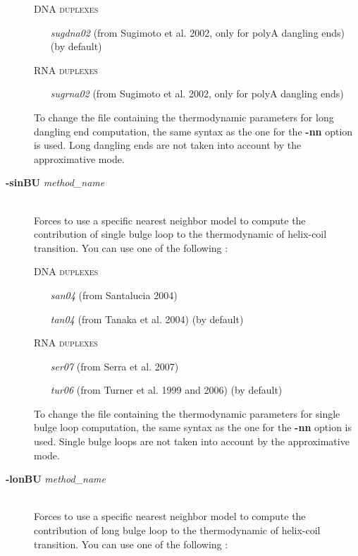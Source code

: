 \documentclass{article}
\begin{document}
\begin{description}
  \textsc{DNA duplexes}
    \begin{itemize}
    \item [\textit{sugdna02}] (from Sugimoto et al. 2002, only for polyA dangling ends) (by default)     
    \end{itemize}
  \textsc{RNA duplexes}
    \begin{itemize}
    \item [\textit{sugrna02}] (from Sugimoto et al. 2002, only for polyA dangling ends)
    \end{itemize}
  To change the file containing the thermodynamic parameters for long dangling end computation, the same syntax as the one for the \textbf{-nn} option is used.
  Long dangling ends are not taken into account by the approximative mode.  
\item [\textbf{-sinBU} \textit{method\_name}]\mbox{}\\ 
  Forces to use a specific nearest neighbor model to compute the contribution of single bulge loop to the thermodynamic of helix-coil transition. 
  You can use one of the following :
  
  \textsc{DNA duplexes}
    \begin{itemize}
    \item [\textit{san04}] (from Santalucia 2004) 
    \item [\textit{tan04}] (from Tanaka et al. 2004)  (by default) 	    
    \end{itemize}
  \textsc{RNA duplexes}
    \begin{itemize}
    \item [\textit{ser07}] (from Serra et al. 2007)
    \item [\textit{tur06}] (from Turner et al. 1999 and 2006)  (by default) 			 			 
    \end{itemize}
  To change the file containing the thermodynamic parameters for single bulge loop computation, the same syntax as the one for the \textbf{-nn} option is used.
  Single bulge loops are not taken into account by the approximative mode. 
\item [\textbf{-lonBU} \textit{method\_name}]\mbox{}\\ 
  Forces to use a specific nearest neighbor model to compute the contribution of long bulge loop to the thermodynamic of helix-coil transition. 
  You can use one of the following :
  

\end{description}
\end{document}
